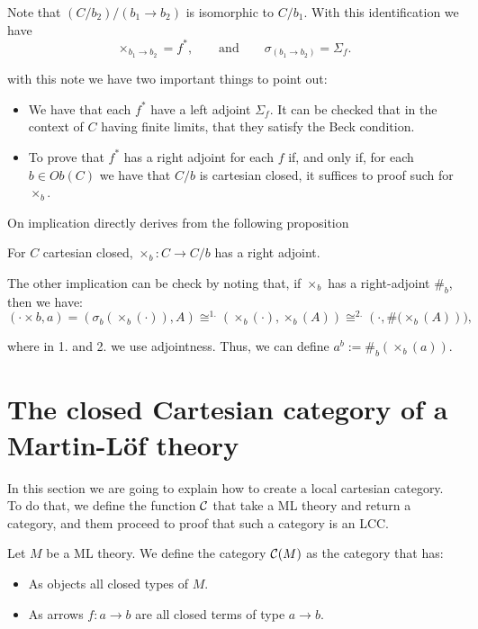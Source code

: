 Note that $(C/b_2)/(b_1\to b_2)$ is isomorphic to $C/b_1$. With this identification we have $$\times_{b_1\to b_2} = f^*,\qquad \text{and} \qquad\sigma_{(b_1\to b_2)} = \Sigma_f.$$

with this note we have two important things to point out:
\begin{itemize}
\item We have that each $f^*$ have a left adjoint $\Sigma_f$. It can be checked that in the context of $C$ having finite limits, that they satisfy the Beck condition. 
\item To prove that $f^*$ has a right adjoint for each $f$ if, and only if, for each $b\in Ob(C)$ we have that $C/b$ is cartesian closed, it suffices to proof such for $\times_b$.\\
\end{itemize}

On implication directly derives from the following proposition
\begin{proposition}
  For $C$ cartesian closed, $\times_b: C\to C/b$ has a right adjoint.
\end{proposition}

The other implication can be check by noting that, if $\times_b$ has a right-adjoint $\#_b$, then we have:
$$(\cdot \times b, a) = \left( \sigma_b(\times_b(\cdot)), A\right) \cong^{1.} \left( \times_b(\cdot), \times_b(A)\right)  \cong^{2.} \left( \cdot, \#(\times_b(A)\right)), $$

where in 1. and 2. we use adjointness. Thus, we can define $a^b:= \#_b(\times_b(a))$.


\section{The closed Cartesian category of a Martin-L\"of theory}
\label{InternalLCC}
In this section we are going to explain how to create a local cartesian category. To do that, we define the function $\mathcal{C}$ that take a ML theory and return a category, and them proceed to proof that such a category is an LCC.

\begin{definition}
  Let $M$ be a ML theory. We define the category $\mathcal{C}(M)$ as the category that has:
  \begin{itemize}
  \item As objects all closed types of $M$.
  \item As arrows $f:a\to b$ are all closed terms of type $a\to b$.
  \end{itemize}
\end{definition}

